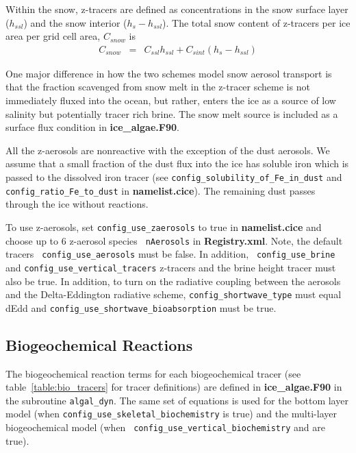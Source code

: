 Within the snow,  z-tracers are defined as concentrations in the snow
surface layer ($h_{ssl}$) and the snow interior ($h_s-h_{ssl}$).  The
total snow content of z-tracers per ice area per grid cell area, $C_{snow}$  is 
\begin{eqnarray}
C_{snow} & = & C_{ssl}h_{ssl} + C_{sint}(h_{s}-h_{ssl}) 
\end{eqnarray}

One major difference in how the two schemes model snow aerosol transport is
that the fraction scavenged from snow melt in the z-tracer scheme is not immediately fluxed
into the ocean, but rather, enters the ice as a source of low
salinity but potentially tracer rich brine.  The snow melt source is
included as a surface flux condition in {\bf ice\_algae.F90}.  

All the z-aerosols are nonreactive with the exception of the
dust aerosols. We assume that a small fraction of the dust flux into
the ice has soluble iron  which is passed to the dissolved iron
tracer (see {\tt config\_solubility\_of\_Fe\_in\_dust} and {\tt
  config\_ratio\_Fe\_to\_dust} in {\bf namelist.cice}).  The remaining dust passes through the ice without reactions.

To use z-aerosols, set {\tt config\_use\_zaerosols}  to true in {\bf
 namelist.cice} and choose up to 6  z-aerosol species {\tt
  nAerosols} in  {\bf
  Registry.xml}.    Note, the default tracers {\tt
  config\_use\_aerosols} must be false. In addition, {\tt
  config\_use\_brine} and {\tt config\_use\_vertical\_tracers} z-tracers and the brine height tracer  must also be
true.   In addition, to turn on the radiative
coupling between the aerosols and the Delta-Eddington radiative
scheme, {\tt config\_shortwave\_type} must equal dEdd and {\tt config\_use\_shortwave\_bioabsorption} must
be true.

\subsection{Biogeochemical Reactions}
\label{sec:reactions}
The biogeochemical reaction terms for each biogeochemical tracer (see
table~\ref{table:bio_tracers} for tracer definitions) are defined in {\bf ice\_algae.F90}
in the subroutine {\tt algal\_dyn}. The same set of equations is used
for the bottom layer  model (when {\tt config\_use\_skeletal\_biochemistry} is true) and the
multi-layer biogeochemical model (when {\tt
  config\_use\_vertical\_biochemistry} and  are true).  

